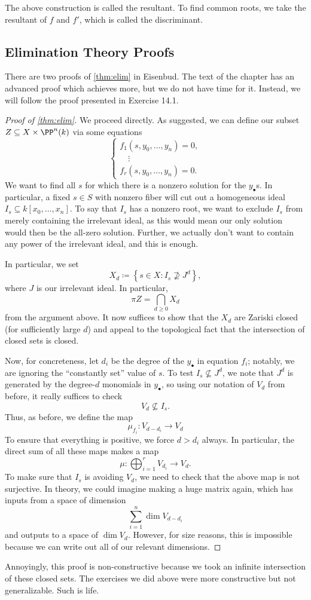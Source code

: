 \begin{remark}
	The above construction is called the resultant. To find common roots, we take the resultant of $f$ and $f'$, which is called the discriminant.
\end{remark}

\subsection{Elimination Theory Proofs}
There are two proofs of \autoref{thm:elim} in Eisenbud. The text of the chapter has an advanced proof which achieves more, but we do not have time for it. Instead, we will follow the proof presented in Exercise 14.1.
\begin{proof}[Proof of \autoref{thm:elim}]
	We proceed directly. As suggested, we can define our subset $Z\subseteq X\times\PP^n(k)$ via some equations
	\[\begin{cases}
		f_1(s,y_0,\ldots,y_n)=0, \\
		\quad\vdots \\
		f_r(s,y_0,\ldots,y_n)=0.
	\end{cases}\]
	We want to find all $s$ for which there is a nonzero solution for the $y_\bullet$s. In particular, a fixed $s\in S$ with nonzero fiber will cut out a homogeneous ideal $I_s\subseteq k[x_0,\ldots,x_n]$. To say that $I_s$ has a nonzero root, we want to exclude $I_s$ from merely containing the irrelevant ideal, as this would mean our only solution would then be the all-zero solution. Further, we actually don't want to contain any power of the irrelevant ideal, and this is enough.

	In particular, we set
	\[X_d\coloneqq\left\{s\in X:I_s\not\supseteq J^d\right\},\]
	where $J$ is our irrelevant ideal. In particular,
	\[\pi Z=\bigcap_{d\ge0}X_d\]
	from the argument above. It now suffices to show that the $X_d$ are Zariski closed (for sufficiently large $d$) and appeal to the topological fact that the intersection of closed sets is closed.

	Now, for concreteness, let $d_i$ be the degree of the $y_\bullet$ in equation $f_i$; notably, we are ignoring the ``constantly set'' value of $s$. To test $I_s\not\subseteq J^d$, we note that $J^d$ is generated by the degree-$d$ monomials in $y_\bullet$, so using our notation of $V_d$ from before, it really suffices to check
	\[V_d\not\subseteq I_s.\]
	Thus, as before, we define the map
	\[\mu_{f_i}\colon V_{d-d_i}\to V_d\]
	To ensure that everything is positive, we force $d>d_i$ always. In particular, the direct sum of all these maps makes a map
	\[\mu\colon\bigoplus_{i=1}^rV_{d_i}\to V_d.\]
	To make sure that $I_s$ is avoiding $V_d$, we need to check that the above map is not surjective. In theory, we could imagine making a huge matrix again, which has inputs from a space of dimension
	\[\sum_{i=1}^n\dim V_{d-d_i}\]
	and outputs to a space of $\dim V_d$. However, for size reasons, this is impossible because we can write out all of our relevant dimensions.
\end{proof}
Annoyingly, this proof is non-constructive because we took an infinite intersection of these closed sets. The exercises we did above were more constructive but not generalizable. Such is life.

